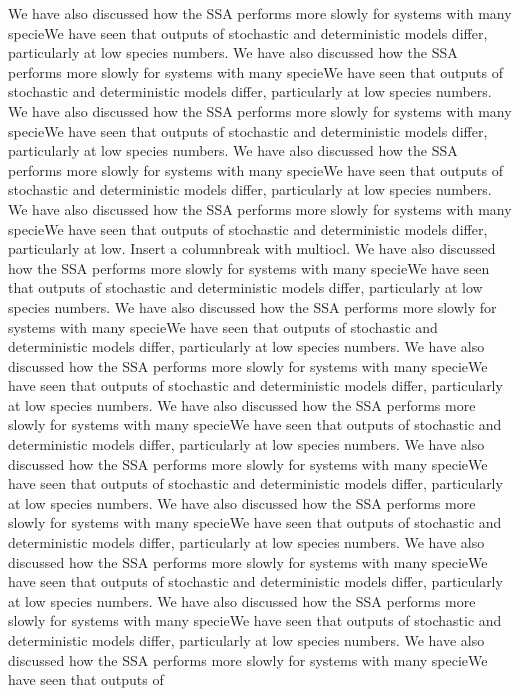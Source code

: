 \documentclass[11pt]{article}
\begin{document}
\begin{multicols}{2}
We have also discussed how the SSA performs more
slowly for systems with many specieWe have seen that outputs of
stochastic and deterministic models differ, particularly at low
species numbers. We have also discussed how the SSA performs more
slowly for systems with many specieWe have seen that outputs of
stochastic and deterministic models differ, particularly at low
species numbers. We have also discussed how the SSA performs more
slowly for systems with many specieWe have seen that outputs of
stochastic and deterministic models differ, particularly at low
species numbers. We have also discussed how the SSA performs more
slowly for systems with many specieWe have seen that outputs of
stochastic and deterministic models differ, particularly at low
species numbers. We have also discussed how the SSA performs more
slowly for systems with many specieWe have seen that outputs of
stochastic and deterministic models differ, particularly at low.
Insert a columnbreak with multiocl.
We have also discussed how the SSA performs more
slowly for systems with many specieWe have seen that outputs of
stochastic and deterministic models differ, particularly at low
species numbers. We have also discussed how the SSA performs more
slowly for systems with many specieWe have seen that outputs of
stochastic and deterministic models differ, particularly at low
species numbers. We have also discussed how the SSA performs more
slowly for systems with many specieWe have seen that outputs of
stochastic and deterministic models differ, particularly at low
species numbers. We have also discussed how the SSA performs more
slowly for systems with many specieWe have seen that outputs of
stochastic and deterministic models differ, particularly at low
species numbers. We have also discussed how the SSA performs more
slowly for systems with many specieWe have seen that outputs of
stochastic and deterministic models differ, particularly at low
species numbers. We have also discussed how the SSA performs more
slowly for systems with many specieWe have seen that outputs of
stochastic and deterministic models differ, particularly at low
species numbers. We have also discussed how the SSA performs more
slowly for systems with many specieWe have seen that outputs of
stochastic and deterministic models differ, particularly at low
species numbers. We have also discussed how the SSA performs more
slowly for systems with many specieWe have seen that outputs of
stochastic and deterministic models differ, particularly at low
species numbers. We have also discussed how the SSA performs more
slowly for systems with many specieWe have seen that outputs of

\end{multicols}
\end{document}
